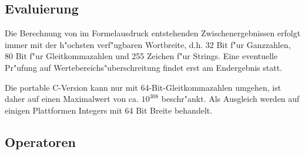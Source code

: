 \documentclass[12pt,a4paper,twoside]{report}
\begin{document}
\subsection{Evaluierung}

Die Berechnung von im Formelausdruck entstehenden Zwischenergebnissen
erfolgt immer mit der h"ochsten verf"ugbaren Wortbreite, d.h. 32 Bit f"ur
Ganzzahlen, 80 Bit f"ur Gleitkommazahlen und 255 Zeichen f"ur Strings.
Eine eventuelle Pr"ufung auf Wertebereichs"uberschreitung findet erst am
Endergebnis statt.
\par
Die portable C-Version  kann nur mit
64-Bit-Gleitkommazahlen umgehen, ist daher auf einen Maximalwert von ca.
$10^{308}$ beschr"ankt.  Als Ausgleich werden auf einigen Plattformen
Integers mit 64 Bit Breite behandelt.

\subsection{Operatoren}
\end{document}
